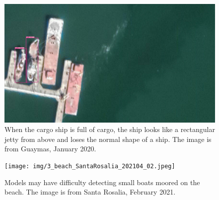 \begin{figure}[t]
    \includegraphics[width=\columnwidth]{img/2_square_Guaymas_202001_01.jpeg}
    \caption{When the cargo ship is full of cargo, the ship looks like a rectangular jetty from above and loses the normal shape of a ship. The image is from Guaymas, January 2020.}
    \label{fig:2_square_Guaymas_202001_01}
\end{figure}

\begin{figure}[t]
    \texttt{[image: img/3\_beach\_SantaRosalia\_202104\_02.jpeg]}
    \caption{Models may have difficulty detecting small boats moored on the beach. The image is from Santa Rosalia, February 2021.}
    \label{fig:3_beach_SantaRosalia_202104_02}
\end{figure}



